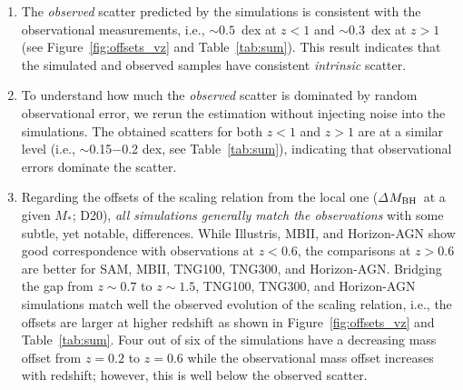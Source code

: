 \documentclass[twocolumn]{aastex631}
\def\smass{{$M_*$}}
\def\mbh{$M_{\rm BH}$}
\begin{document}
\begin{enumerate}

\item{}The {\it observed} scatter predicted by the simulations is consistent with the observational measurements, i.e., $\sim0.5$~dex at $z<1$ and $\sim0.3$~dex at $z>1$ (see Figure~\ref{fig:offsets_vz} and Table~\ref{tab:sum}). This result indicates that the simulated and observed samples have consistent {\it intrinsic} scatter.

\item{}To understand how much the {\it observed} scatter is dominated by random observational error,
we rerun the estimation without injecting noise into the simulations. The obtained scatters for both $z<1$ and $z>1$ are at a similar level (i.e.,  $\sim$0.15$-$0.2 dex, see Table~\ref{tab:sum}), indicating that observational errors dominate the scatter.

\item{} Regarding the offsets of the scaling relation from the local one ($\Delta$\mbh\ at a given \smass; D20), {\it all simulations generally match the observations} with some subtle, yet notable, differences. While Illustris, MBII, and Horizon-AGN show good correspondence with observations at $z<0.6$, the comparisons at $z>0.6$ are better for SAM, MBII, TNG100, TNG300, and Horizon-AGN. Bridging the gap from \hbox{$z\sim0.7$} to $z\sim1.5$, TNG100, TNG300, and Horizon-AGN simulations match well the observed evolution of the scaling relation, i.e., the offsets are larger at higher redshift as shown in Figure~\ref{fig:offsets_vz} and Table~\ref{tab:sum}. Four out of six of the simulations have a decreasing mass offset from $z=0.2$ to $z=0.6$ while the observational mass offset increases with redshift; however, this is well below the observed scatter.
\end{enumerate}
\end{document}
